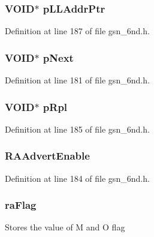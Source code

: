 \hypertarget{a00194_a1b507625be685ecf12811b9d3ec8d633}{
\subsubsection[{pLLAddrPtr}]{\setlength{\rightskip}{0pt plus 5cm}VOID$\ast$ {\bf pLLAddrPtr}}}
\label{a00194_a1b507625be685ecf12811b9d3ec8d633}


Definition at line 187 of file gsn\_\-6nd.h.

\hypertarget{a00194_ac78e1d83d7abdcc1c3ac268f3c1c1eae}{
\subsubsection[{pNext}]{\setlength{\rightskip}{0pt plus 5cm}VOID$\ast$ {\bf pNext}}}
\label{a00194_ac78e1d83d7abdcc1c3ac268f3c1c1eae}


Definition at line 181 of file gsn\_\-6nd.h.

\hypertarget{a00194_a6cae917378bea6a4bf6b1c9262334b96}{
\subsubsection[{pRpl}]{\setlength{\rightskip}{0pt plus 5cm}VOID$\ast$ {\bf pRpl}}}
\label{a00194_a6cae917378bea6a4bf6b1c9262334b96}


Definition at line 185 of file gsn\_\-6nd.h.

\hypertarget{a00194_a775fba1092bccc056e88151dc1547f8f}{
\subsubsection[{RAAdvertEnable}]{ {\bf RAAdvertEnable}}}
\label{a00194_a775fba1092bccc056e88151dc1547f8f}


Definition at line 184 of file gsn\_\-6nd.h.

\hypertarget{a00194_a822a0124d2c88dd7fb00f7f5eb74aaae}{
\subsubsection[{raFlag}]{ {\bf raFlag}}}
\label{a00194_a822a0124d2c88dd7fb00f7f5eb74aaae}
Stores the value of M and O flag 

